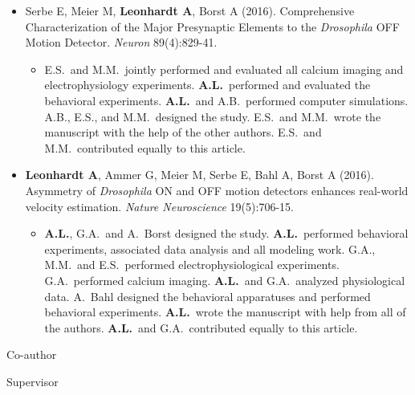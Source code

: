 \begin{itemize}
    \item Serbe E, Meier M, \textbf{Leonhardt A}, Borst A (2016). Comprehensive Characterization of the Major Presynaptic Elements to the \textit{Drosophila} OFF Motion Detector. \textit{Neuron} 89(4):829-41.
    
    \begin{itemize}
        \item
        E.S.\ and M.M.\ jointly performed and evaluated all calcium imaging and electrophysiology experiments. \textbf{A.L.}\ performed and evaluated the behavioral experiments. \textbf{A.L.}\ and A.B.\ performed computer simulations. A.B., E.S., and M.M.\ designed the study. E.S.\ and M.M.\ wrote the manuscript with the help of the other authors. E.S.\ and M.M.\ contributed equally to this article.
    \end{itemize}
    
    \item \textbf{Leonhardt A}, Ammer G, Meier M, Serbe E, Bahl A, Borst A (2016). Asymmetry of \textit{Drosophila} ON and OFF motion detectors enhances real-world velocity estimation. \textit{Nature Neuroscience} 19(5):706-15.
    
    \begin{itemize}
        \item
        \textbf{A.L.}, G.A.\ and A.\ Borst designed the study. \textbf{A.L.}\ performed behavioral experiments, associated data analysis and all modeling work. G.A., M.M.\ and E.S.\ performed electrophysiological experiments. G.A.\ performed calcium imaging. \textbf{A.L.}\ and G.A.\ analyzed physiological data. A.\ Bahl designed the behavioral apparatuses and performed behavioral experiments. \textbf{A.L.}\ wrote the manuscript with help from all of the authors. \textbf{A.L.}\ and G.A.\ contributed equally to this article.
    \end{itemize}
    
\end{itemize}

\vspace{15mm}

  \begin{minipage}[t]{0.5\linewidth}
  \end{minipage}
  \begin{minipage}[t]{0.5\linewidth}
    \raggedright
    \par
    Co-author
  \end{minipage}%
  
  \vspace{5mm}
  
    \begin{minipage}[t]{0.5\linewidth}
    \par 
    Supervisor
  \end{minipage}

\newpage